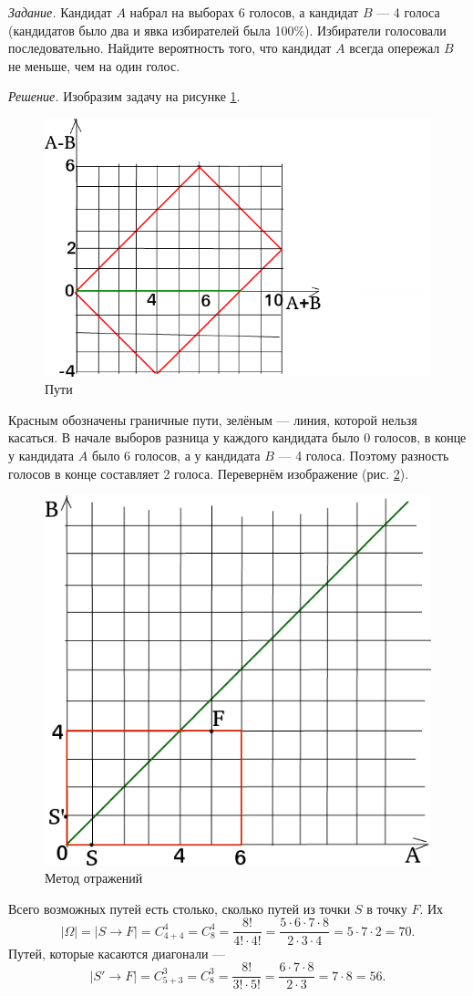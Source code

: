 \textit{Задание.} Кандидат $A$ набрал на выборах 6 голосов, а кандидат $B$ --- 4 голоса (кандидатов было два и явка избирателей была 100\%).
Избиратели голосовали последовательно.
Найдите вероятность того, что кандидат $A$ всегда опережал $B$ не меньше, чем на один голос.

\textit{Решение.} Изобразим задачу на рисунке \ref{fig:23}.

\begin{figure}[h!]
  \centering
  \includegraphics[width=.4\textwidth]{./pictures/t1v2_3.png}
  \caption{Пути}
  \label{fig:23}
\end{figure}

Красным обозначены граничные пути, зелёным --- линия, которой нельзя касаться.
В начале выборов разница у каждого кандидата было 0 голосов, в конце у кандидата $A$ было 6 голосов, а у кандидата $B$ --- 4 голоса.
Поэтому разность голосов в конце составляет 2 голоса.
Перевернём изображение (рис. \ref{fig:231}).

\begin{figure}[h!]
  \centering
  \includegraphics[width=.4\textwidth]{./pictures/t1v2_31.png}
  \caption{Метод отражений}
  \label{fig:231}
\end{figure}

Всего возможных путей есть столько, сколько путей из точки $S$ в точку $F$.
Их
$$ \left| \Omega \right| =
\left| S \rightarrow F \right| =
C_{4+4}^4 =
C_{8}^4 =
\frac{8!}{4! \cdot 4!} =
\frac{5 \cdot 6 \cdot 7 \cdot 8}{2 \cdot 3 \cdot 4} =
5 \cdot 7 \cdot 2 =
70.$$
Путей, которые касаются диагонали ---
$$ \left| S' \rightarrow F \right| =
C_{5+3}^3 =
C_8^3 =
\frac{8!}{3! \cdot 5!} =
\frac{6 \cdot 7 \cdot 8}{2 \cdot 3} =
7 \cdot 8 =
56.$$

